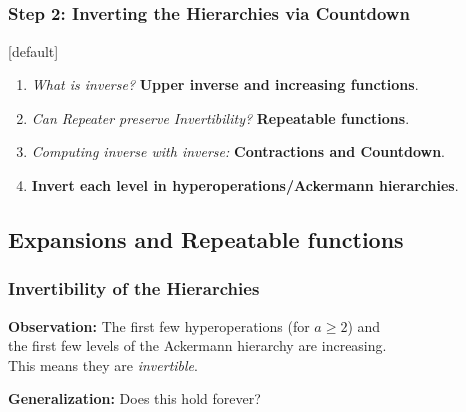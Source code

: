 \subsection*{}
\begin{frame}
\frametitle{Step 2: Inverting the Hierarchies via \textbf{Countdown}}
[default]

\begin{enumerate}[\bfseries 1.]
	\itemsep 3ex
	\item<done@1->
	\emph{What is inverse?} \textbf{Upper inverse and increasing functions}.
	
	\item<come@2->
	\emph{Can Repeater preserve Invertibility?} \textbf{Repeatable functions}.
	
	\item
	\emph{Computing inverse with inverse:} \textbf{Contractions and Countdown}.
	
	\item
	\textbf{Invert each level in hyperoperations/Ackermann hierarchies}.
\end{enumerate}
\end{frame}


\subsection{Expansions and Repeatable functions}

\begin{frame}
\frametitle{Invertibility of the Hierarchies}

\textbf{Observation:} The first few hyperoperations (for $a\ge 2$) and \\ the first few levels of the Ackermann hierarchy are increasing. \\This means they are \emph{invertible}.

\bigskip

\textbf{Generalization:} Does this hold forever?

\bigskip


%
%
\end{frame}


